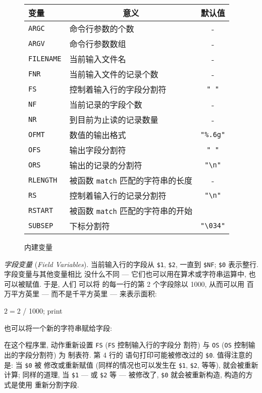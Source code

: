 \begin{figure}[ht]
\captionsetup{type=table}
\caption{内建变量}
\label{tbl:built_in_variables}
\begin{center}
\begin{tabular}{l|l|c}
	\hline
	\hline
	变量	& \multicolumn{1}{c}{意义}	& 默认值 \\
	\hline
	\verb'ARGC'	& 命令行参数的个数	& - \\
	\verb'ARGV'	& 命令行参数数组	& - \\
	\verb'FILENAME'	& 当前输入文件名	& - \\
	\verb'FNR'	& 当前输入文件的记录个数& - \\
	\verb'FS'	& 控制着输入行的字段分割符 & \verb'" "' \\
	\verb'NF'	& 当前记录的字段个数	& - \\
	\verb'NR'	& 到目前为止读的记录数量 & - \\
	\verb'OFMT'	& 数值的输出格式	& \verb'"%.6g"' \\
	\verb'OFS'	& 输出字段分割符	& \verb'" "' \\
	\verb'ORS'	& 输出的记录的分割符	& \verb'"\n"'	\\
	\verb'RLENGTH'	& 被函数 \verb'match' 匹配的字符串的长度 & - \\
	\verb'RS'	& 控制着输入行的记录分割符 & \verb'"\n"'	\\
	\verb'RSTART'	& 被函数 \verb'match' 匹配的字符串的开始 \\
	\verb'SUBSEP'	& 下标分割符	& \verb'"\034"'	\\
	\hline
\end{tabular}
\end{center}
\end{figure}

\emph{字段变量} (\emph{Field Variables}). 当前输入行的字段从 \verb'$1',
\verb'$2', 一直到 \verb'$NF'; \verb'$0' 表示整行. 字段变量与其他变量相比
没什么不同 --- 它们也可以用在算术或字符串运算中, 也可以被赋值. 于是, 人们
可以将  的每一行的第 2 个字段除以 1000, 从而可以用
百万平方英里 --- 而不是千平方英里 --- 来表示面积:
\begin{myverb}
    { $2 = $2 / 1000; print }
\end{myverb}
也可以将一个新的字符串赋给字段:
在这个程序里, \BEGIN 动作重新设置 \verb'FS' (\verb'FS' 控制输入行的字段分
割符) 与 \verb'OS' (\verb'OS' 控制输出的字段分割符) 为 制表符. 第 4 行的
\print 语句打印可能被修改过的 \verb'$0'. 值得注意的是: 当 \verb'$0' 被
修改或重新赋值 (同样的情况也可以发生在 \verb'$1', \verb'$2', 等等), \nf
就会被重新计算; 同样的道理, 当 \verb'$1' --- 或 \verb'$2' 等 --- 被修改了,
\verb'$0' 就会被重新构造, 构造的方式是使用 \OFS 重新分割字段.

